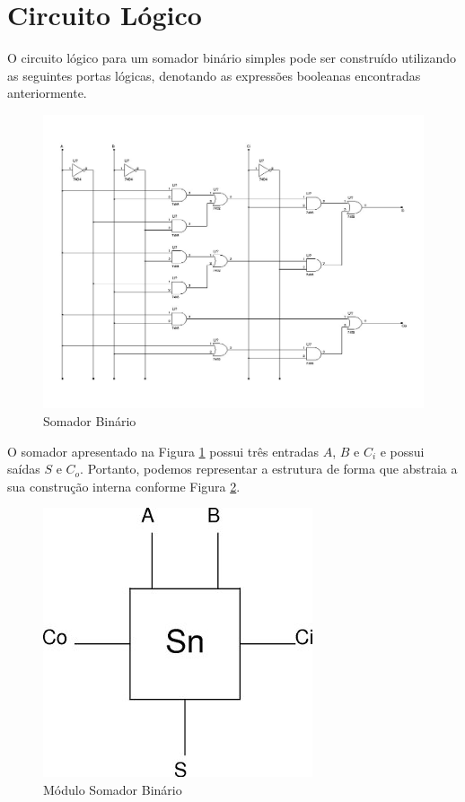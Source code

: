 \documentclass{article}
\begin{document}
\section{Circuito Lógico}
\label{sec:circuito-logico}

O circuito lógico para um somador binário simples pode ser construído utilizando
as seguintes portas lógicas, denotando as expressões booleanas encontradas
anteriormente.

\begin{figure}
    \centering{}
    \includegraphics[width=\textwidth]{sources/ci1.jpg}
    \caption{Somador Binário}
    \label{fig:ci1}
\end{figure}

O somador apresentado na Figura \ref{fig:ci1} possui três entradas $A$, $B$ e
$C_i$ e possui saídas $S$ e $C_o$. Portanto, podemos representar a estrutura de
forma que abstraia a sua construção interna conforme Figura \ref{fig:sum}.

\begin{figure}
    \centering{}
    \includegraphics[scale=0.4]{sources/sum.jpg}
    \caption{Módulo Somador Binário}
    \label{fig:sum}
\end{figure}
\end{document}
